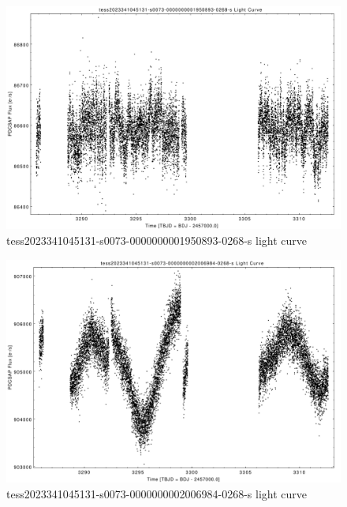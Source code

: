 \documentclass[a4paper,12pt]{article}
\begin{document}
\begin{figure}[htbp]
    \centering
    \includegraphics[width = 1\textwidth]{
      lightcurves/tess2023341045131-s0073-0000000001950893-0268-s.pdf}
    \caption{tess2023341045131-s0073-0000000001950893-0268-s light curve}
\end{figure}
\begin{figure}[htbp]
    \centering
    \includegraphics[width = 1\textwidth]{
      lightcurves/tess2023341045131-s0073-0000000002006984-0268-s.pdf}
    \caption{tess2023341045131-s0073-0000000002006984-0268-s light curve}
\end{figure}
\end{document}
